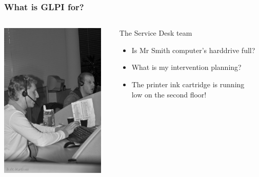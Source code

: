 \documentclass{beamer}
\begin{document}
\begin{frame}
    \frametitle{What is GLPI for?}

 \begin{columns}
 \begin{column}{0.1\textwidth}
         \includegraphics[height=7.5cm]{./pics/helpdesk.jpg}
 \end{column}
 \begin{column}{1\textwidth}

    \begin{block}{The Service Desk team}
        \begin{itemize}
            \item Is Mr Smith computer's harddrive full?
            \item What is my intervention planning?
            \item The printer ink cartridge is running \\
                low on the second floor!
        \end{itemize}
    \end{block}
 \end{column}
\end{columns}


\end{frame}
\end{document}
